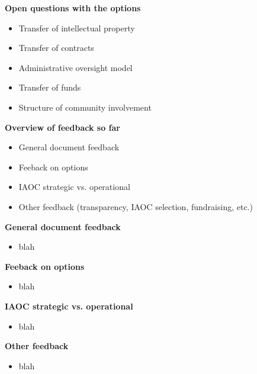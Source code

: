 \documentclass[helvetica]{seminar}
\newcommand{\heading}[1]{%
  \begin{center} 
    \large\bf 
    #1 
  \end{center} 
  \vspace{.4 in}}
\begin{document}
\begin{slide}

\heading{Open questions with the options}

\begin{itemize}
\item Transfer of intellectual property
\item Transfer of contracts
\item Administrative oversight model
\item Transfer of funds
\item Structure of community involvement
\end{itemize}

\end{slide}

\begin{slide}

\heading{Overview of feedback so far}

\begin{itemize}
\item General document feedback
\item Feeback on options
\item IAOC strategic vs. operational
\item Other feedback (transparency, IAOC selection, fundraising, etc.)
\end{itemize}

\end{slide}


\begin{slide}

\heading{General document feedback}

\begin{itemize}
\item blah
\end{itemize}

\end{slide}


\begin{slide}

\heading{Feeback on options}

\begin{itemize}
\item blah
\end{itemize}

\end{slide}


\begin{slide}

\heading{IAOC strategic vs. operational}

\begin{itemize}
\item blah
\end{itemize}

\end{slide}


\begin{slide}

\heading{Other feedback}

\begin{itemize}
\item blah
\end{itemize}

\end{slide}
\end{document}
